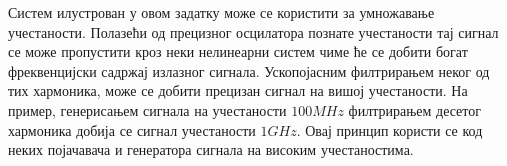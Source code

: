 Систем илустрован у овом задатку може се користити за умножавање учестаности. Полазећи од прецизног осцилатора познате учестаности 
тај сигнал се може пропустити кроз неки нелинеарни систем чиме ће се добити богат фреквенцијски садржај излазног сигнала. Ускопојасним 
филтрирањем неког од тих хармоника, може се добити прецизан сигнал на вишој учестаности. На пример, генерисањем сигнала на учестаности 
$100\unit{MHz}$ филтрирањем десетог хармоника добија се сигнал учестаности $1\unit{GHz}$. Овај принцип користи се код неких појачавача 
и генератора сигнала на високим учестаностима. 